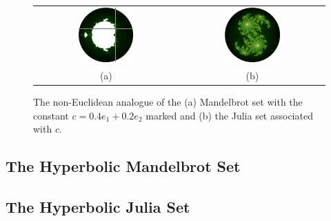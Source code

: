 \begin{figure}
\centering
\begin{tabular}{c@{$\quad$}c}
\includegraphics[width=0.4\textwidth]{hyp_mandel_julia_pos} 
 & \includegraphics[width=0.4\textwidth]{julia_hyp} \\
                          (a) & (b)
\end{tabular}
\caption{\label{fig:noneuclidean_sets}The non-Euclidean analogue of the (a) Mandelbrot set with
  the constant $c = 0.4e_1 + 0.2e_2$ marked and (b) the Julia
  set associated with $c$.}
\end{figure}

\subsection{The Hyperbolic Mandelbrot Set}

\subsection{The Hyperbolic Julia Set}
